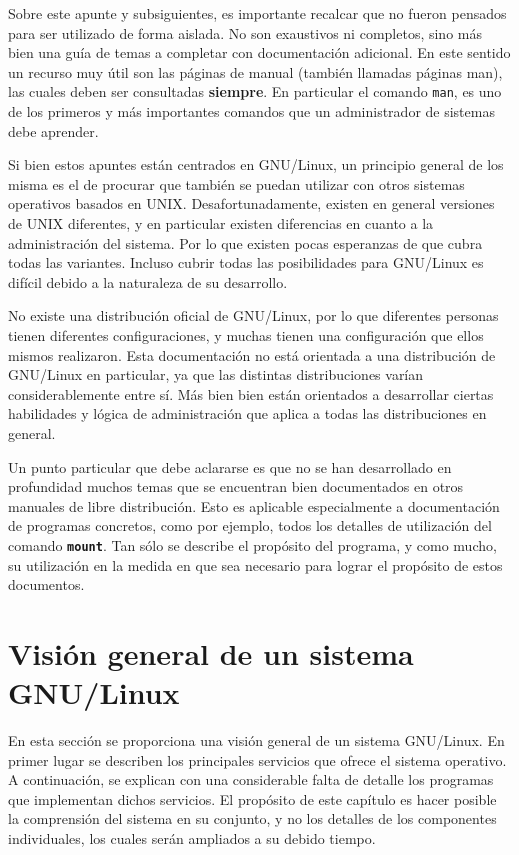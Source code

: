 \documentclass[12pt]{article}
\begin{document}
Sobre este apunte y subsiguientes, es importante recalcar que no fueron
pensados para ser utilizado de forma aislada. No son exaustivos ni 
completos, sino más bien una guía de temas a completar con 
documentación adicional. En este sentido un recurso muy útil son
las páginas de manual (también llamadas páginas man), las cuales deben ser
consultadas \textbf{siempre}. En particular el comando \texttt{man}, es
 uno de los primeros y más importantes comandos que un administrador de 
sistemas debe aprender.   

Si bien estos apuntes están centrados en GNU/Linux, un principio 
general de los misma es el de procurar que también se puedan utilizar 
con otros sistemas operativos basados en UNIX. Desafortunadamente, 
existen en general versiones de UNIX diferentes, y en
particular existen diferencias en cuanto a la administración del sistema. 
Por lo que existen pocas esperanzas de que cubra todas las variantes.
Incluso cubrir todas las posibilidades para GNU/Linux es difícil debido 
a la naturaleza de su desarrollo. 

No existe una distribución oficial de GNU/Linux, por lo que diferentes
personas tienen diferentes configuraciones, y muchas tienen una 
configuración que ellos mismos realizaron. Esta documentación no está 
orientada a una distribución de GNU/Linux en particular, ya que las 
distintas distribuciones varían considerablemente entre sí. Más bien 
bien están orientados a desarrollar ciertas habilidades y lógica de 
administración que aplica a todas las distribuciones en general. 

Un punto particular que debe aclararse es que no se han desarrollado en
profundidad muchos temas que se encuentran bien documentados en otros 
manuales de libre distribución. Esto es aplicable especialmente a 
documentación de programas concretos, como por ejemplo, todos los 
detalles de utilización del comando \texttt{\textbf{mount}}. Tan sólo se 
describe el propósito del programa, y como mucho, su utilización en la
 medida en que sea necesario para lograr el propósito de estos documentos.


\section{Visión general de un sistema GNU/Linux}

En esta sección se proporciona una visión
general de un sistema GNU/Linux. En primer lugar se describen los 
principales servicios que ofrece el sistema operativo. A continuación, 
se explican con una considerable falta de detalle los programas que 
implementan dichos servicios. El propósito de este capítulo es hacer 
posible la comprensión del sistema en su conjunto, y no los detalles 
de los componentes individuales, los cuales serán ampliados a su debido 
tiempo. 
\end{document}
